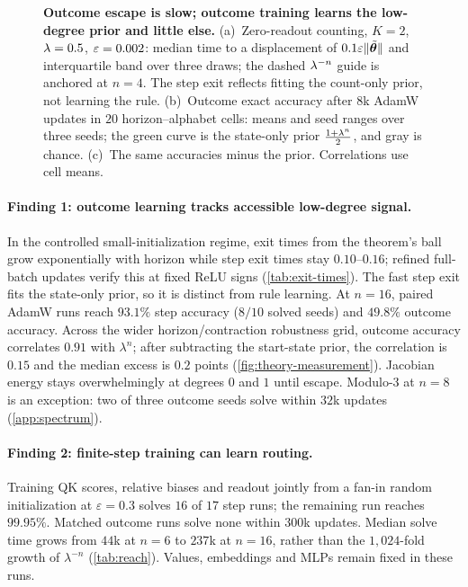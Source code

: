 \begin{figure}[t]
\centering
\resizebox{\linewidth}{!}{}
\caption{\textbf{Outcome escape is slow; outcome training learns the low-degree prior and little else.}
(a)~Zero-readout counting, $K=2$, $\lambda=0.5$, $\varepsilon=0.002$: median time to a displacement of $0.1\varepsilon\|\tilde{\bm\theta}\|$ and interquartile band over three draws; the dashed $\lambda^{-n}$ guide is anchored at $n=4$. The step exit reflects fitting the count-only prior, not learning the rule.
(b)~Outcome exact accuracy after $8$k AdamW updates in $20$ horizon--alphabet cells: means and seed ranges over three seeds; the green curve is the state-only prior $\frac{1+\lambda^n}{2}$, and gray is chance.
(c)~The same accuracies minus the prior. Correlations use cell means.}
\label{fig:theory-measurement}
\label{fig:lambda-grid}
\end{figure}

\paragraph{Finding 1: outcome learning tracks accessible low-degree signal.}
In the controlled small-initialization regime, exit times from the theorem's ball grow
exponentially with horizon while step exit times stay $0.10$--$0.16$; refined full-batch
updates verify this at fixed ReLU signs (\cref{tab:exit-times}). The fast step exit fits
the state-only prior, so it is distinct from rule learning. At $n=16$, paired AdamW runs
reach $93.1\%$ step accuracy ($8/10$ solved seeds) and $49.8\%$ outcome accuracy.
Across the wider horizon/contraction robustness grid, outcome accuracy correlates $0.91$ with $\lambda^n$;
after subtracting the start-state prior, the correlation is $0.15$ and the median excess
is $0.2$ points (\cref{fig:theory-measurement}). Jacobian energy stays overwhelmingly at
degrees $0$ and $1$ until escape. Modulo-$3$ at $n=8$ is an exception: two of three
outcome seeds solve within $32$k updates (\cref{app:spectrum}).

\paragraph{Finding 2: finite-step training can learn routing.}
Training QK scores, relative biases and readout jointly from a fan-in random initialization
at $\varepsilon=0.3$ solves $16$ of $17$ step runs; the remaining run reaches $99.95\%$.
Matched outcome runs solve none within $300$k updates. Median solve time grows from
$44$k at $n=6$ to $237$k at $n=16$, rather than the $1{,}024$-fold growth of $\lambda^{-n}$
(\cref{tab:reach}). Values, embeddings and MLPs remain fixed in these runs.

